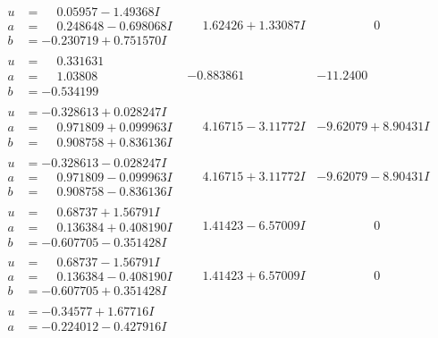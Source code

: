 \documentclass[1p]{elsarticle_modified}
\theoremstyle{definition}
\begin{document}
$$\begin{array}{c|c|c}
\begin{aligned}
u &= \phantom{-}0.05957 - 1.49368 I \\
a &= \phantom{-}0.248648 - 0.698068 I \\
b &= -0.230719 + 0.751570 I\end{aligned}
 & \phantom{-}1.62426 + 1.33087 I & \phantom{-0.000000 } 0 \\ \hline\begin{aligned}
u &= \phantom{-}0.331631\phantom{ +0.000000I} \\
a &= \phantom{-}1.03808\phantom{ +0.000000I} \\
b &= -0.534199\phantom{ +0.000000I}\end{aligned}
 & -0.883861\phantom{ +0.000000I} & -11.2400\phantom{ +0.000000I} \\ \hline\begin{aligned}
u &= -0.328613 + 0.028247 I \\
a &= \phantom{-}0.971809 + 0.099963 I \\
b &= \phantom{-}0.908758 + 0.836136 I\end{aligned}
 & \phantom{-}4.16715 - 3.11772 I & -9.62079 + 8.90431 I \\ \hline\begin{aligned}
u &= -0.328613 - 0.028247 I \\
a &= \phantom{-}0.971809 - 0.099963 I \\
b &= \phantom{-}0.908758 - 0.836136 I\end{aligned}
 & \phantom{-}4.16715 + 3.11772 I & -9.62079 - 8.90431 I \\ \hline\begin{aligned}
u &= \phantom{-}0.68737 + 1.56791 I \\
a &= \phantom{-}0.136384 + 0.408190 I \\
b &= -0.607705 - 0.351428 I\end{aligned}
 & \phantom{-}1.41423 - 6.57009 I & \phantom{-0.000000 } 0 \\ \hline\begin{aligned}
u &= \phantom{-}0.68737 - 1.56791 I \\
a &= \phantom{-}0.136384 - 0.408190 I \\
b &= -0.607705 + 0.351428 I\end{aligned}
 & \phantom{-}1.41423 + 6.57009 I & \phantom{-0.000000 } 0 \\ \hline\begin{aligned}
u &= -0.34577 + 1.67716 I \\
a &= -0.224012 - 0.427916 I \\

\end{aligned}
\end{array}$$
\end{document}
